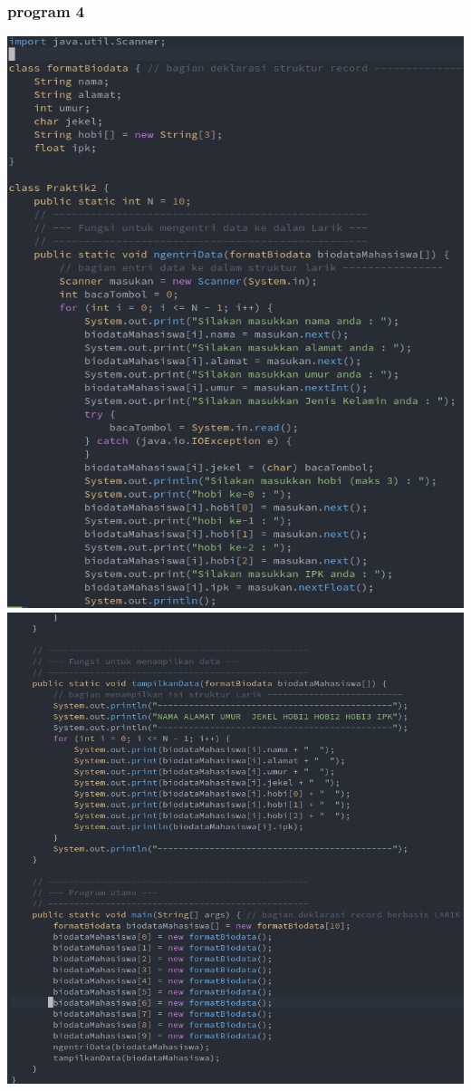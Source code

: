 \documentclass[a4paper,12pt]{article}
\begin{document}
\subsubsection{program 4}
\begin{center}
    \includegraphics[scale=.5]{code06.png} 
    \newpage
    \includegraphics[scale=.5]{code07.png} 
\end{center}
\end{document}
